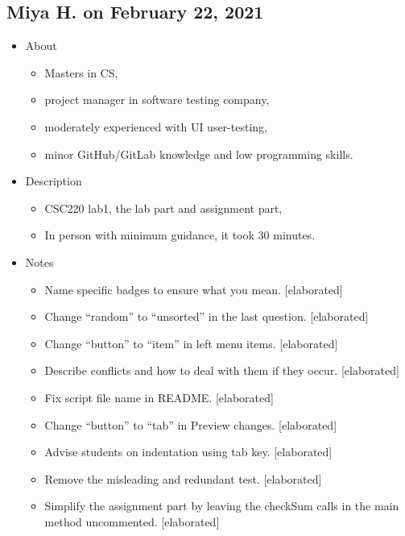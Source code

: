 \subsection{Miya H. on February 22, 2021}\label{ssec:miya0222}

\begin{itemize}
\item
  {About}
  \begin{itemize}
  \item
    {Masters in CS,}
  \item
    {project manager in software testing company,}
  \item
    {moderately experienced with UI user-testing,}
  \item
    {minor GitHub/GitLab knowledge and low programming skills.}
  \end{itemize}

\item
  {Description}
  \begin{itemize}
  \item
    {CSC220 lab1, the lab part and assignment part,}
  \item
    {In person with minimum guidance, it took 30 minutes.}
  \end{itemize}

\item
  {Notes}
  \begin{itemize}
  \item
    {Name specific badges to ensure what you mean. {[}elaborated{]}}
  \item
    {Change ``random'' to ``unsorted'' in the last question. {[}elaborated{]}}
  \item
    {Change ``button'' to ``item'' in left menu items. {[}elaborated{]}}
  \item
    {Describe conflicts and how to deal with them if they occur. {[}elaborated{]}}
  \item
    {Fix script file name in README. {[}elaborated{]}}
  \item
    {Change ``button'' to ``tab'' in Preview changes. {[}elaborated{]}}
  \item
    {Advise students on indentation using tab key. {[}elaborated{]}}
  \item
    {Remove the misleading and redundant test. {[}elaborated{]}}
  \item
    {Simplify the assignment part by leaving the checkSum calls in the main method uncommented. {[}elaborated{]}}
  \end{itemize}


\end{itemize}
